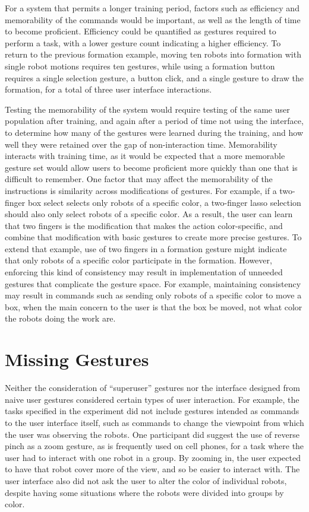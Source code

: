 For a system that permits a longer training period, factors such as efficiency and memorability of the commands would be important, as well as the length of time to become proficient. 
Efficiency could be quantified as gestures required to perform a task, with a lower gesture count indicating a higher efficiency.
To return to the previous formation example, moving ten robots into formation with single robot motions requires ten gestures, while using a formation button requires a single selection gesture, a button click, and a single gesture to draw the formation, for a total of three user interface interactions.  

Testing the memorability of the system would require testing of the same user population after training, and again after a period of time not using the interface, to determine how many of the gestures were learned during the training, and how well they were retained over the gap of non-interaction time. 
Memorability interacts with training time, as it would be expected that a more memorable gesture set would allow users to become proficient more quickly than one that is difficult to remember.
One factor that may affect the memorability of the instructions is similarity across modifications of gestures. 
For example, if a two-finger box select selects only robots of a specific color, a two-finger lasso selection should also only select robots of a specific color. 
As a result, the user can learn that two fingers is the modification that makes the action color-specific, and combine that modification with basic gestures to create more precise gestures. 
To extend that example, use of two fingers in a formation gesture might indicate that only robots of a specific color participate in the formation. 
However, enforcing this kind of consistency may result in implementation of unneeded gestures that complicate the gesture space. 
For example, maintaining consistency may result in commands such as sending only robots of a specific color to move a box, when the main concern to the user is that the box be moved, not what color the robots doing the work are.  

\section{Missing Gestures}

Neither the consideration of ``superuser'' gestures nor the interface designed from naive user gestures considered certain types of user interaction. For example, the tasks specified in the experiment did not include gestures intended as commands to the user interface itself, such as commands to change the viewpoint from which the user was observing the robots. 
One participant did suggest the use of reverse pinch as a zoom gesture, as is frequently used on cell phones, for a task where the user had to interact with one robot in a group. 
By zooming in, the user expected to have that robot cover more of the view, and so be easier to interact with. 
The user interface also did not ask the user to alter the color of individual robots, despite having some situations where the robots were divided into groups by color. 

